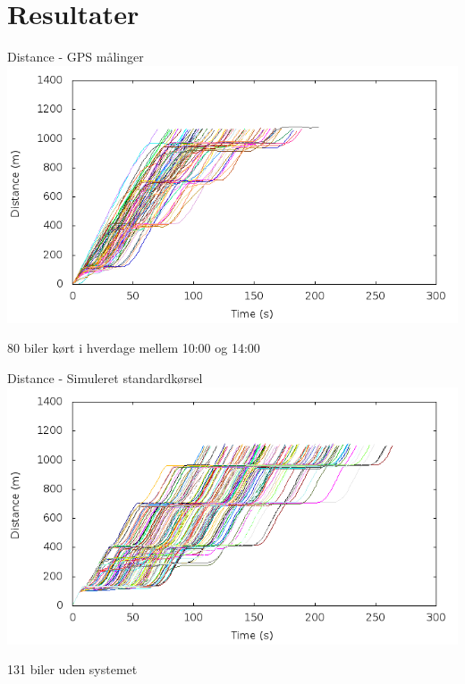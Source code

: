 \section{Resultater}

\begin{frame}{Distance - GPS målinger}
\includegraphics[width=1\textwidth]{../Article/images/Real/RealDistance.png}

80 biler kørt i hverdage mellem 10:00 og 14:00
\end{frame}

\begin{frame}{Distance - Simuleret standardkørsel}
\includegraphics[width=1\textwidth]{../Article/images/tp0/distanceUncontrolled0.png}

131 biler uden systemet
\end{frame}

